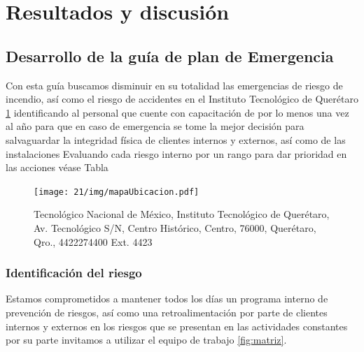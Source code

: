     \section{Resultados y discusión}
    
    \subsection{Desarrollo de la guía de plan de Emergencia}
    
    Con esta guía buscamos disminuir en su totalidad las emergencias de riesgo de incendio, así como el riesgo de accidentes en el Instituto Tecnológico de Querétaro \ref{fig:mapaUbicacion} identificando al personal que cuente con capacitación de por lo menos una vez al año para que en caso de emergencia se tome la mejor decisión para salvaguardar la integridad física de clientes internos y externos, así como de las instalaciones
    Evaluando cada riesgo interno por un rango para dar prioridad en las acciones véase Tabla %
    
    
    \begin{figure}[H]
        \centering
        \texttt{[image: 21/img/mapaUbicacion.pdf]}
        \caption{Tecnológico Nacional de México, Instituto Tecnológico de Querétaro, Av. Tecnológico S/N, Centro Histórico, Centro, 76000, Querétaro, Qro., 4422274400 Ext. 4423}
        \label{fig:mapaUbicacion}
    \end{figure}
    
    \subsubsection{Identificación del riesgo}
    
    Estamos comprometidos a mantener todos los días un programa interno de prevención de riesgos, así como una retroalimentación por parte de clientes internos y externos en los riesgos que se presentan en las actividades constantes por su parte invitamos a utilizar el equipo de trabajo \ref{fig:matriz}.
    
